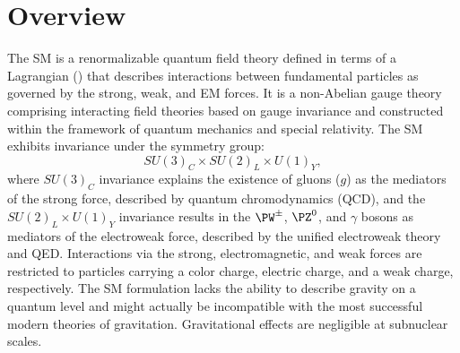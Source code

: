 
\section{Overview}
\label{sec:sm_overview}

The SM is a renormalizable quantum field theory defined in terms of a Lagrangian (\lagrang) that describes interactions between fundamental particles as governed by the strong, weak, and EM forces.
It is a non-Abelian gauge theory comprising interacting field theories based on gauge invariance and constructed within the framework of quantum mechanics and special relativity.
The SM exhibits invariance under the symmetry group:
\begin{equation*}
    SU(3)_C \times SU(2)_L \times U(1)_Y,
\end{equation*}
where $SU(3)_C$ invariance explains the existence of gluons ($g$) as the mediators of the strong force, described by quantum chromodynamics (QCD), and the $SU(2)_L \times U(1)_Y$ invariance results in the $\PW^\pm$, $\PZ^0$, and $\gamma$ bosons as mediators of the electroweak force, described by the unified electroweak theory and QED.
Interactions via the strong, electromagnetic, and weak forces are restricted to particles carrying a color charge, electric charge, and a weak charge, respectively.
The SM formulation lacks the ability to describe gravity on a quantum level and might actually be incompatible with the most successful modern theories of gravitation.
Gravitational effects are negligible at subnuclear scales.


